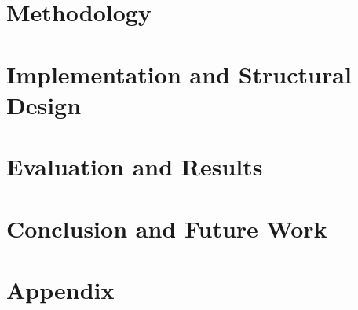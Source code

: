 \documentclass[10pt]{report}
\begin{document}
\section{Methodology}

\clearpage
\section{Implementation and Structural Design}

\clearpage
\section{Evaluation and Results}

\clearpage
\section{Conclusion and Future Work}

\clearpage
\section{Appendix}


 


\newpage
\end{document}
